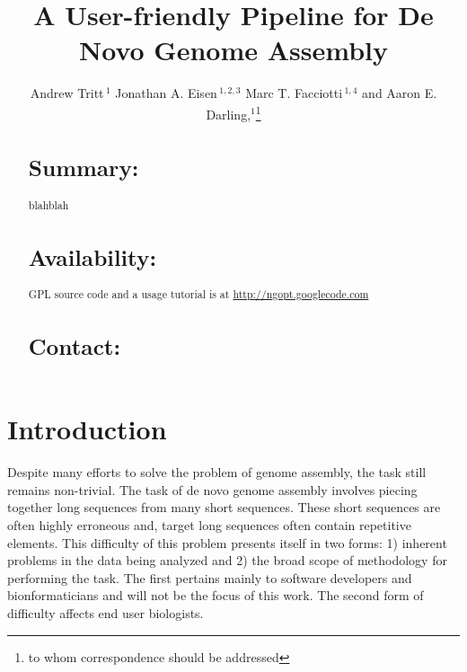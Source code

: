 \documentclass{bioinfo}
\begin{document}

\title[a5]{A User-friendly Pipeline for De Novo Genome Assembly}
\author[Tritt \textit{et~al}]{Andrew Tritt\,$^{1}$ Jonathan A. Eisen\,$^{1,2,3}$ Marc T. Facciotti\,$^{1,4}$ and Aaron E. Darling,$^{1}$\footnote{to whom correspondence should be addressed}}
\address{$^{1}$Genome Center, $^{2}$ Dept. of Evolution and Ecology, $^{3}$ Medical Microbiology and Immunology, 
$^{4}$ Biomedical Engineering, University of California-Davis, Davis, CA 95616.}



\maketitle

\begin{abstract}

\section{Summary:}
blahblah
\section{Availability:}
GPL source code and a usage tutorial is at \href{http://ngopt.googlecode.com}{http://ngopt.googlecode.com}

\section{Contact:} \href{rabid apes}{}
\end{abstract}

\section{Introduction}
Despite many efforts to solve the problem of genome assembly, the task still remains non-trivial. 
The task of de novo genome assembly involves piecing together long sequences from many short sequences.
These short sequences are often highly erroneous and, target long sequences often contain repetitive 
elements. This difficulty of this problem presents itself in two forms: 1) inherent problems in the data being 
analyzed and 2) the broad scope of methodology for performing the task. The first pertains
mainly to software developers and bionformaticians and will not be the focus of this work. The 
second form of difficulty affects end user biologists. 
\end{document}
